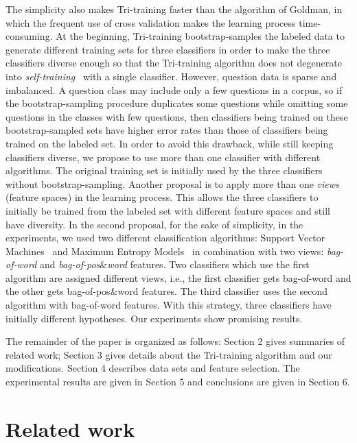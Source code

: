 \documentclass[english]{jnlp_1.4}
\begin{document}
The simplicity also makes Tri-training faster than the algorithm
of Goldman, in which the frequent use of cross validation makes
the learning process time-consuming. At the beginning,
Tri-training bootstrap-samples the labeled data to generate
different training sets for three classifiers in order to make the
three classifiers diverse enough so that the Tri-training
algorithm does not degenerate into
\emph{self-training}~\cite{Nigam2000} with a single classifier.
However, question data is sparse and imbalanced. A question class
may include only a few questions in a corpus, so if the
bootstrap-sampling procedure duplicates some questions while
omitting some  questions in the classes with few questions, then
classifiers being trained on these bootstrap-sampled sets have
higher error rates than those of classifiers being trained on the
labeled set. In order to avoid this drawback, while still keeping
classifiers diverse, we propose to use more than one classifier
with different algorithms. The original training set is initially
used by the three classifiers without bootstrap-sampling. Another
proposal is to apply more than one \emph{views} (feature spaces)
in the learning process. This allows the three classifiers to
initially be trained from the labeled set with different feature
spaces and still have diversity. In the second proposal, for the
sake of simplicity, in the experiments, we used two different
classification algorithms: Support Vector Machines~\cite{Cortes95}
and Maximum Entropy Models~\cite{Adam96} in combination with two
views: \emph{bag-of-word} and \emph{bag-of-pos}$\&$\emph{word}
features. Two classifiers which use the first algorithm are
assigned different views, i.e., the first classifier gets
bag-of-word and the other gets bag-of-pos\&word features. The
third classifier uses the second algorithm with bag-of-word
features. With this strategy, three classifiers have initially
different hypotheses. Our experiments show promising results.

The remainder of the paper is organized as follows: Section 2
gives summaries of related work; Section 3 gives details about the
Tri-training algorithm and our modifications. Section 4 describes
data sets and feature selection. The experimental results are
given in Section 5 and conclusions are given in Section 6.


\section{Related work}
\end{document}
